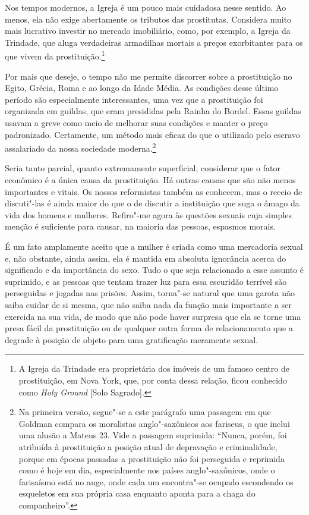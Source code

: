 Nos tempos modernos, a Igreja é um pouco mais cuidadosa nesse sentido.
Ao menos, ela não exige abertamente os tributos das prostitutas. Considera
muito mais lucrativo investir no mercado imobiliário, como, por
exemplo, a Igreja da Trindade, que aluga verdadeiras armadilhas mortais
a preços exorbitantes para os que vivem da prostituição.\footnote{A
  Igreja da Trindade era proprietária dos imóveis de um famoso centro de
  prostituição, em Nova York, que, por conta dessa relação, ficou
  conhecido como \emph{Holy Ground} {[}Solo Sagrado{]}.}

Por mais que deseje, o tempo não me permite discorrer sobre a
prostituição no Egito, Grécia, Roma e ao longo da Idade Média. As
condições desse último período são especialmente interessantes, uma vez
que a prostituição foi organizada em guildas, que eram presididas pela Rainha do
Bordel. Essas guildas usavam a greve como meio de melhorar suas
condições e manter o preço padronizado. Certamente, um método mais
eficaz do que o utilizado pelo escravo assalariado da nossa sociedade
moderna.\footnote{Na primeira versão, segue"-se a este parágrafo uma
  passagem em que Goldman compara os moralistas anglo"-saxônicos aos
  fariseus, o que inclui uma alusão a Mateus 23. Vide a passagem
  suprimida: ``Nunca, porém, foi atribuída à prostituição a posição
  atual de depravação e criminalidade, porque em épocas passadas a
  prostituição não foi perseguida e reprimida como é hoje em dia,
  especialmente nos países anglo"-saxônicos, onde o farisaísmo está no
  auge, onde cada um encontra"-se ocupado escondendo os esqueletos em sua
  própria casa enquanto aponta para a chaga do companheiro''.}

Seria tanto parcial, quanto extremamente superficial, considerar que o\label{parcial}
fator econômico é a única causa da prostituição. Há outras causas que
são não menos importantes e vitais. Os nossos reformistas também as
conhecem, mas o receio de discuti"-las é ainda maior do que o de discutir
a instituição que suga o âmago da vida dos homens e mulheres. Refiro"-me
agora às questões sexuais cuja simples menção é suficiente para causar,
na maioria das pessoas, espasmos morais.

É um fato amplamente aceito que a mulher é criada como uma mercadoria
sexual e, não obstante, ainda assim, ela é mantida em absoluta
ignorância acerca do significado e da importância do sexo. Tudo o que
seja relacionado a esse assunto é suprimido, e as pessoas que tentam
trazer luz para essa escuridão terrível são perseguidas e jogadas nas
prisões. Assim, torna"-se natural que uma garota não saiba cuidar de si
mesma, que não saiba nada da função mais importante a ser exercida na
sua vida, de modo que não pode haver surpresa que ela se torne uma presa
fácil da prostituição ou de qualquer outra forma de relacionamento que a
degrade à posição de objeto para uma gratificação meramente sexual.\label{objeto}

